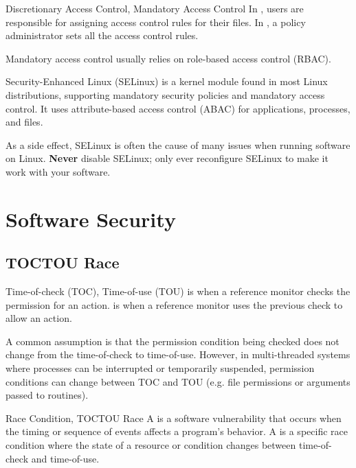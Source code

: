 \documentclass[code]{amznotes}
\begin{document}
\begin{dfnbox}{Discretionary Access Control, Mandatory Access Control}{}
    In , users are responsible for assigning access control rules for their files. In , a policy administrator sets all the access control rules.
\end{dfnbox}

Mandatory access control usually relies on role-based access control (RBAC).

\begin{dfnbox}{Security-Enhanced Linux (SELinux)}{}
     is a kernel module found in most Linux distributions, supporting mandatory security policies and mandatory access control. It uses attribute-based access control (ABAC) for applications, processes, and files.
\end{dfnbox}

As a side effect, SELinux is often the cause of many issues when running software on Linux. \textbf{Never} disable SELinux; only ever reconfigure SELinux to make it work with your software.

\chapter{Software Security}

\section{TOCTOU Race}

\begin{dfnbox}{Time-of-check (TOC), Time-of-use (TOU)}{}
     is when a reference monitor checks the permission for an action.  is when a reference monitor uses the previous check to allow an action.
\end{dfnbox}

A common assumption is that the permission condition being checked does not change from the time-of-check to time-of-use. However, in multi-threaded systems where processes can be interrupted or temporarily suspended, permission conditions can change between TOC and TOU (e.g. file permissions or arguments passed to routines).

\begin{dfnbox}{Race Condition, TOCTOU Race}{}
    A  is a software vulnerability that occurs when the timing or sequence of events affects a program's behavior. A  is a specific race condition where the state of a resource or condition changes between time-of-check and time-of-use.
\end{dfnbox}
\end{document}
